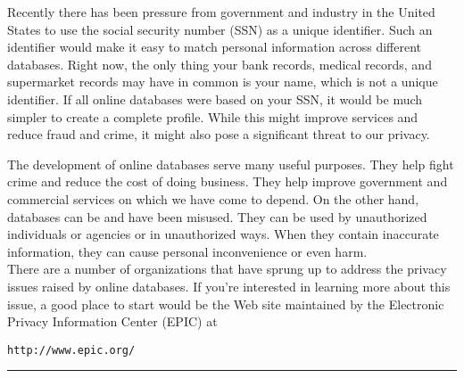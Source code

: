 Recently there has been pressure from government and industry in the
United States to use the social security number (SSN) as a unique
identifier.   Such an identifier would make it easy to match personal
information across different databases.  Right now, the only thing your
bank records, medical records, and supermarket records may have in
common is your name, which is not a unique identifier.   If all online
databases were based on your SSN, it would be much simpler to create a
complete profile.  While this might improve services and reduce
fraud and crime, it might also pose a significant threat to our
privacy.

The development of online databases serve many useful
purposes.  They help fight crime and reduce the cost of doing
business.  They help improve government and commercial services on which we
have come to depend.  On the other hand, databases can be and
have been misused.  They can be used by unauthorized individuals or
agencies or in unauthorized ways.  When they contain inaccurate
information, they can cause personal inconvenience or even harm.\\
\hspace*{1pc}There are a number of organizations that have sprung up to address
the privacy issues raised by online databases.  If you're interested
in learning more about this issue, a good place to start would be the
Web site maintained by the Electronic Privacy Information Center
(EPIC) at
\begin{jjjlisting}
\begin{lstlisting}[commentstyle=\color{black}]
http://www.epic.org/
\end{lstlisting}
\end{jjjlisting}
\rule[0pt]{26pc}{2pt}\\



\label{chapter-summary}

\label{technical-terms}

